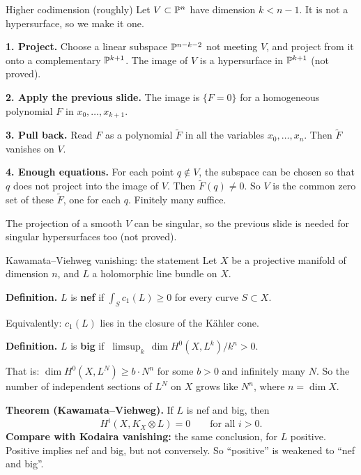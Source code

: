 \begin{frame}{Higher codimension (roughly)}
\label{fr:chow-4}
Let \(V\subset\mathbb P^n\) have dimension \(k<n-1\). It is not a hypersurface, so we make it one.
\par\medskip
\textbf{1. Project.} Choose a linear subspace \(\mathbb P^{n-k-2}\) not meeting \(V\), and project from it onto a complementary \(\mathbb P^{k+1}\). The image of \(V\) is a hypersurface in \(\mathbb P^{k+1}\) (not proved).
\par\medskip
\textbf{2. Apply the previous slide.} The image is \(\{F=0\}\) for a homogeneous polynomial \(F\) in \(x_0,\ldots,x_{k+1}\).
\par\medskip
\textbf{3. Pull back.} Read \(F\) as a polynomial \(\widetilde F\) in all the variables \(x_0,\ldots,x_n\). Then \(\widetilde F\) vanishes on \(V\).
\par\medskip
\textbf{4. Enough equations.} For each point \(q\notin V\), the subspace can be chosen so that \(q\) does not project into the image of \(V\). Then \(\widetilde F(q)\ne0\). So \(V\) is the common zero set of these \(\widetilde F\), one for each \(q\). Finitely many suffice.
\par\medskip
The projection of a smooth \(V\) can be singular, so the previous slide is needed for singular hypersurfaces too (not proved).
\end{frame}

\begin{frame}{Kawamata--Viehweg vanishing: the statement}
\label{fr:kv-statement}
Let \(X\) be a projective manifold of dimension \(n\), and \(L\) a holomorphic line bundle on \(X\).
\par\smallskip
\textbf{Definition.} \(L\) is \textbf{nef} if \(\int_Sc_1(L)\ge0\) for every curve \(S\subset X\).
\par\smallskip
Equivalently: \(c_1(L)\) lies in the closure of the Kähler cone.
\par\medskip
\textbf{Definition.} \(L\) is \textbf{big} if \(\ \limsup_{k}\,\dim H^0(X,L^k)/k^n>0\).
\par\smallskip
That is: \(\dim H^0(X,L^N)\ge b\cdot N^n\) for some \(b>0\) and infinitely many \(N\). So the number of independent sections of \(L^N\) on \(X\) grows like \(N^n\), where \(n=\dim X\).
\par\medskip
\textbf{Theorem (Kawamata--Viehweg).} If \(L\) is nef and big, then
\[
\boxed{H^i(X,K_X\otimes L)=0\qquad\text{for all } i>0 .}
\]
\textbf{Compare with Kodaira vanishing:} the same conclusion, for \(L\) positive. Positive implies nef and big, but not conversely. So ``positive'' is weakened to ``nef and big''.
\end{frame}

